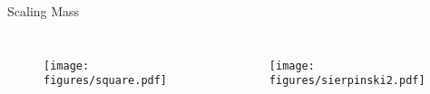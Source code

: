 \documentclass[10pt]{beamer}
\begin{document}
\begin{frame}{Scaling Mass}
    \begin{columns}[c]
        \column{1.5in}
        \begin{figure}[h!]
            \centering
            \texttt{[image: figures/square.pdf]}
        \end{figure}
    \column{1.5in}
        \begin{figure}[h!]
            \centering
            \texttt{[image: figures/sierpinski2.pdf]}
        \end{figure}
    \end{columns}
    \begin{columns}[c]
        \column{1.5in}
            \begin{align*}
            \end{align*}
        \column{1.5in}
            \begin{align*}
            \end{align*}
    \end{columns}
\end{frame}
\end{document}
